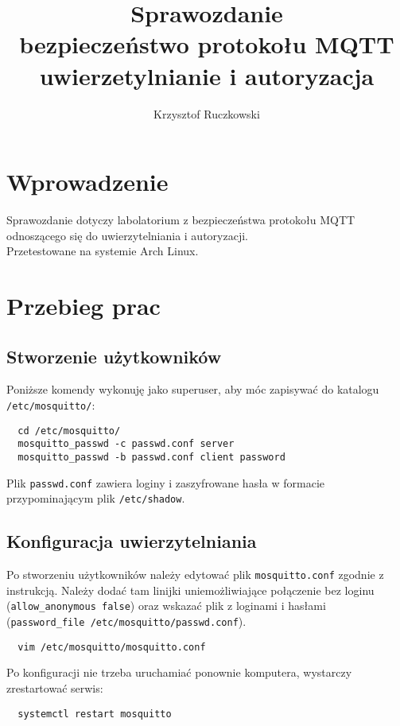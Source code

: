\documentclass[10pt,a4paper]{article}
\author{Krzysztof Ruczkowski}
\title{Sprawozdanie\\bezpieczeństwo protokołu MQTT\\uwierzetylnianie i autoryzacja}
\begin{document}
\maketitle
\newpage
\tableofcontents
\newpage

\section{Wprowadzenie}

Sprawozdanie dotyczy labolatorium z bezpieczeństwa protokołu MQTT odnoszącego się do uwierzytelniania i autoryzacji.
\\
Przetestowane na systemie Arch Linux.

\section{Przebieg prac}

\subsection{Stworzenie użytkowników}
Poniższe komendy wykonuję jako superuser, aby móc zapisywać do katalogu \texttt{/etc/mosquitto/}:

\begin{verbatim}
  cd /etc/mosquitto/
  mosquitto_passwd -c passwd.conf server
  mosquitto_passwd -b passwd.conf client password
\end{verbatim}

Plik \texttt{passwd.conf} zawiera loginy i zaszyfrowane hasła w formacie przypominającym plik \texttt{/etc/shadow}.

\subsection{Konfiguracja uwierzytelniania}
Po stworzeniu użytkowników należy edytować plik \texttt{mosquitto.conf} zgodnie z instrukcją.
Należy dodać tam linijki uniemożliwiające połączenie bez loginu (\texttt{allow\_anonymous false}) oraz wskazać plik z loginami i hasłami (\texttt{password\_file /etc/mosquitto/passwd.conf}).

\begin{verbatim}
  vim /etc/mosquitto/mosquitto.conf
\end{verbatim}

Po konfiguracji nie trzeba uruchamiać ponownie komputera, wystarczy zrestartować serwis:

\begin{verbatim}
  systemctl restart mosquitto
\end{verbatim}
\end{document}
